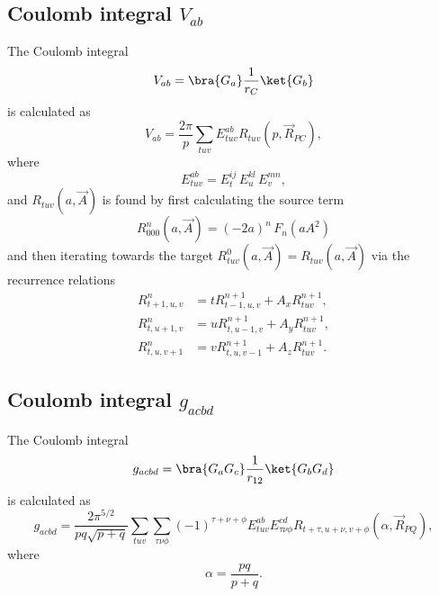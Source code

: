 \subsection*{Coulomb integral $V_{ab}$}
The Coulomb integral
\begin{equation}
 V_{ab} = \bra{G_a}\frac{1}{r_C}\ket{G_b}
\end{equation}
is calculated as
\begin{equation}
\label{eq:Vab_compute}
 V_{ab} = \frac{2\pi}{p}\sum_{tuv}E^{ab}_{tuv} R_{tuv}(p,\vec R_{PC}),
\end{equation}
where
\begin{equation}
 E^{ab}_{tuv} = E^{ij}_t\,E^{kl}_u\,E^{mn}_v,
\end{equation}
and $R_{tuv}(a,\vec A)$ is found by first calculating the source term
\begin{equation}
 R^n_{000}(a,\vec A) = (-2a)^n\,F_n(a A^2)
\end{equation}
and then iterating towards the target $R^0_{tuv}(a,\vec A) = R_{tuv}(a,\vec A)$ via the recurrence relations
\begin{equation}
 \begin{split}
  R^n_{t+1,u,v} & = tR^{n+1}_{t-1,u,v} + A_x R^{n+1}_{tuv}, \\
  R^n_{t,u+1,v} & = uR^{n+1}_{t,u-1,v} + A_y R^{n+1}_{tuv}, \\
  R^n_{t,u,v+1} & = vR^{n+1}_{t,u,v-1} + A_z R^{n+1}_{tuv}.
 \end{split}
\end{equation}


\subsection*{Coulomb integral $g_{acbd}$}
The Coulomb integral
\begin{equation}
 g_{acbd} = \bra{G_a G_c}\frac{1}{r_{12}}\ket{G_b G_d}
\end{equation}
is calculated as
\begin{equation}
\label{eq:gabcd_compute}
 g_{acbd} = \frac{2\pi^{5/2}}{pq\sqrt{p+q}}\sum_{tuv}\sum_{\tau\nu\phi}(-1)^{\tau+\nu+\phi}E^{ab}_{tuv}E^{cd}_{\tau\nu\phi}R_{t+\tau,u+\nu,v+\phi}(\alpha,\vec R_{PQ}),
\end{equation}
where
\begin{equation}
  \alpha = \frac{pq}{p + q}.
\end{equation}


